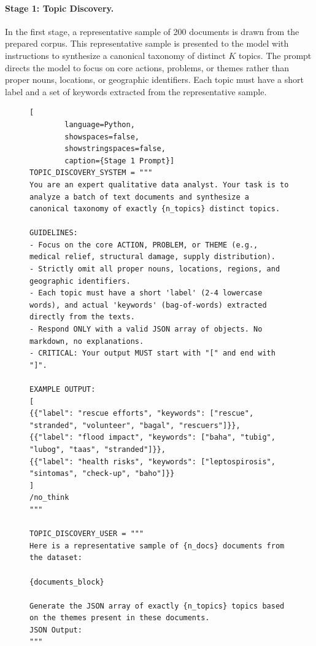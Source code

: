 \documentclass[12pt,a4paper]{report}
\begin{document}
\paragraph{Stage 1: Topic Discovery.}
In the first stage, a representative sample of 200 documents is drawn from the
prepared corpus. This representative sample is presented to the model with
instructions to synthesize a canonical taxonomy of distinct $K$ topics. The
prompt directs the model to focus on core actions, problems, or themes rather
than proper nouns, locations, or geographic identifiers. Each topic must have a
short label and a set of keywords extracted from the representative sample.

\begin{figure}[htbp]
	\centering
	\label{ls:stage-1-prompt}
	\begin{minipage}{0.9\textwidth}
	\begin{lstlisting}[
		language=Python,
		showspaces=false,
		showstringspaces=false,
		caption={Stage 1 Prompt}]
TOPIC_DISCOVERY_SYSTEM = """
You are an expert qualitative data analyst. Your task is to analyze a batch of text documents and synthesize a canonical taxonomy of exactly {n_topics} distinct topics.
		
GUIDELINES:
- Focus on the core ACTION, PROBLEM, or THEME (e.g., medical relief, structural damage, supply distribution).
- Strictly omit all proper nouns, locations, regions, and geographic identifiers.
- Each topic must have a short 'label' (2-4 lowercase words), and actual 'keywords' (bag-of-words) extracted directly from the texts.
- Respond ONLY with a valid JSON array of objects. No markdown, no explanations.
- CRITICAL: Your output MUST start with "[" and end with "]".
		
EXAMPLE OUTPUT:
[
{{"label": "rescue efforts", "keywords": ["rescue", "stranded", "volunteer", "bagal", "rescuers"]}},
{{"label": "flood impact", "keywords": ["baha", "tubig", "lubog", "taas", "stranded"]}},
{{"label": "health risks", "keywords": ["leptospirosis", "sintomas", "check-up", "baho"]}}
]
/no_think
"""
		
TOPIC_DISCOVERY_USER = """
Here is a representative sample of {n_docs} documents from the dataset:
		
{documents_block}
		
Generate the JSON array of exactly {n_topics} topics based on the themes present in these documents.
JSON Output:
"""
	\end{lstlisting}
	\end{minipage}
\end{figure}
\end{document}
